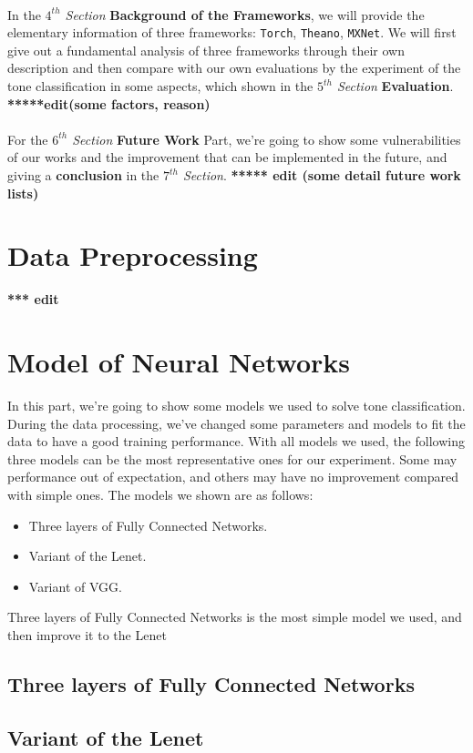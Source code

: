 \documentclass[12pt]{article}
\begin{document}
\\
In the {\it $4^{th}$ Section} {\bf Background of the Frameworks}, we will provide the elementary information of three frameworks: \texttt{Torch}, \texttt{Theano}, \texttt{MXNet}. We will first give out a fundamental analysis of three frameworks through their own description and then compare with our own evaluations by the experiment of the tone classification in some aspects, which shown in the {\it $5^{th}$ Section} {\bf Evaluation}. {\bf ******edit(some factors, reason)}\\
\\
For the {\it $6^{th}$ Section} {\bf Future Work} Part, we're going to show some vulnerabilities of our works and the improvement that can be implemented in the future, and giving a {\bf conclusion} in the {\it $7^{th}$ Section}.  {\bf ****** edit (some detail future work lists)}
\\

\section{Data Preprocessing}{\bf **** edit }

\section{Model of Neural Networks}
In this part, we're going to show some models we used to solve tone classification. During the data processing, we've changed some parameters and models to fit the data to have a good training performance. With all models we used, the following three models can be the most representative ones for our experiment. Some may performance out of expectation, and others may have no improvement compared with simple ones. The models we shown are as follows:
\begin{itemize}
	\item Three layers of Fully Connected Networks.
	\item Variant of the Lenet.
	\item Variant of VGG.
\end{itemize}
Three layers of Fully Connected Networks is the most simple model we used, and then improve it to the Lenet

\subsection{Three layers of Fully Connected Networks}

\subsection{Variant of the Lenet}
\end{document}
